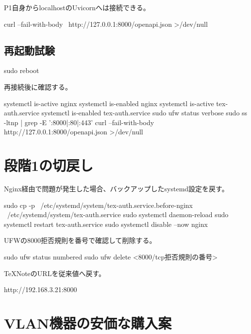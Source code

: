 \documentclass[uplatex,a4paper,11pt]{jsarticle}
\begin{document}
P1自身からlocalhostのUvicornへは接続できる。

\begin{command}
curl --fail-with-body \
  http://127.0.0.1:8000/openapi.json >/dev/null
\end{command}

\subsection{再起動試験}

\begin{command}
sudo reboot
\end{command}

再接続後に確認する。

\begin{command}
systemctl is-active nginx
systemctl is-enabled nginx
systemctl is-active tex-auth.service
systemctl is-enabled tex-auth.service
sudo ufw status verbose
sudo ss -ltnp | grep -E ':8000|:80|:443'
curl --fail-with-body http://127.0.0.1:8000/openapi.json >/dev/null
\end{command}

\section{段階1の切戻し}

Nginx経由で問題が発生した場合、バックアップしたsystemd設定を戻す。

\begin{command}
sudo cp -p \
  /etc/systemd/system/tex-auth.service.before-nginx \
  /etc/systemd/system/tex-auth.service
sudo systemctl daemon-reload
sudo systemctl restart tex-auth.service
sudo systemctl disable --now nginx
\end{command}

UFWの8000拒否規則を番号で確認して削除する。

\begin{command}
sudo ufw status numbered
sudo ufw delete <8000/tcp拒否規則の番号>
\end{command}

TeXNoteのURLを従来値へ戻す。

\begin{command}
http://192.168.3.21:8000
\end{command}

\newpage
\section{VLAN機器の安価な購入案}
\end{document}
